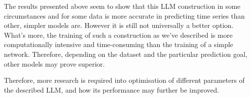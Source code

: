 The results presented above seem to show that this LLM construction in some circumstances and for some data is more accurate in predicting time series than other, simpler models are.
However it is still not universally a better option. What's more, the training of such a construction as we've described is more computationally intensive and time-consuming than the training of a simple network.
Therefore, depending on the dataset and the particular prediction goal, other models may prove superior.

Therefore, more research is required into optimisation of different parameters of the described LLM, and how its performance may further be improved.

